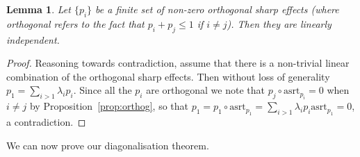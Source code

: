 \documentclass[b5paper,onecolumn,12pt,accepted=2019-05-03, issue=1, volume=1, shorttitle=papers/compositionality-1-1]{compositionalityarticle}
\DeclarePairedDelimiter{\ceil}{\lceil}{\rceil}
\newcounter{counter}
\numberwithin{counter}{section}
\newtheorem{proposition}[counter]{Proposition}
\newtheorem{definition}[counter]{Definition}
\newtheorem{lemma}[counter]{Lemma}
\newcommand{\asrt}{\text{asrt}}
\begin{document}



\begin{lemma}\label{lem:orthindep}
	Let $\{p_i\}$ be a finite set of non-zero orthogonal sharp effects (where orthogonal refers to the fact that $p_i+p_j\leq 1$ if $i\neq j$). Then they are linearly independent.
\end{lemma}
\begin{proof}
	Reasoning towards contradiction, assume that there is a non-trivial linear combination of the orthogonal sharp effects. Then without loss of generality $p_1 = \sum_{i>1} \lambda_i p_i$. Since all the $p_i$ are orthogonal we note that $p_j\circ \asrt_{p_i} = 0$ when $i\neq j$ by Proposition~\ref{prop:orthog}, so that $p_1 = p_1\circ\asrt_{p_1} = \sum_{i>1}\lambda_i p_i\asrt_{p_1} = 0$, a contradiction.
\end{proof}

\noindent We can now prove our diagonalisation theorem.
\end{document}
